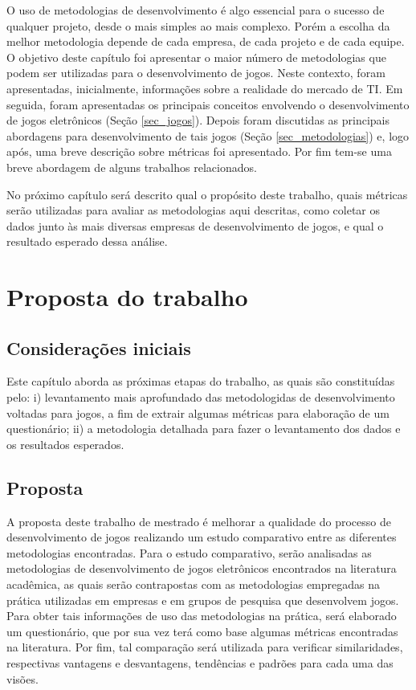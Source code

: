 \documentclass[quali]{ppgccufscar}
\begin{document}
O uso de metodologias de desenvolvimento é algo essencial para o sucesso de qualquer projeto, desde o mais simples ao mais complexo. Porém a escolha da melhor metodologia depende de cada empresa, de cada projeto e de cada equipe. O objetivo deste capítulo foi apresentar o maior número de metodologias que podem ser utilizadas para o desenvolvimento de jogos. Neste contexto, foram apresentadas, inicialmente, informações sobre a realidade do mercado de TI. Em seguida, foram apresentadas os principais conceitos envolvendo o desenvolvimento de jogos eletrônicos (Seção \ref{sec_jogos}). Depois foram discutidas as principais abordagens para desenvolvimento de tais jogos (Seção \ref{sec_metodologias}) e, logo após, uma breve descrição sobre métricas foi apresentado. Por fim tem-se uma breve abordagem de alguns trabalhos relacionados.

No próximo capítulo será descrito qual o propósito deste trabalho, quais métricas serão utilizadas para avaliar as metodologias aqui descritas, como coletar os dados junto às mais diversas empresas de desenvolvimento de jogos, e qual o resultado esperado dessa análise.




\chapter{Proposta do trabalho}
\label{cap_3}

\section{Considerações iniciais}

Este capítulo aborda as próximas etapas do trabalho, as quais são constituídas pelo: i) levantamento mais aprofundado das metodologidas de desenvolvimento voltadas para jogos, a fim de extrair algumas métricas para elaboração de um questionário; ii) a metodologia detalhada para fazer o levantamento dos dados e os resultados esperados.


\section{Proposta}

A proposta deste trabalho de mestrado é melhorar a qualidade do processo de desenvolvimento de jogos realizando um estudo comparativo entre as diferentes metodologias encontradas. Para o estudo comparativo, serão analisadas as metodologias de desenvolvimento de jogos eletrônicos encontrados na literatura acadêmica, as quais serão contrapostas com as metodologias empregadas na prática utilizadas em empresas e em grupos de pesquisa que desenvolvem jogos. Para obter tais informações de uso das metodologias na prática, será elaborado um questionário, que por sua vez terá como base algumas métricas encontradas na literatura. Por fim, tal comparação será utilizada para verificar similaridades, respectivas vantagens e desvantagens, tendências e padrões para cada uma das visões. 
\end{document}
